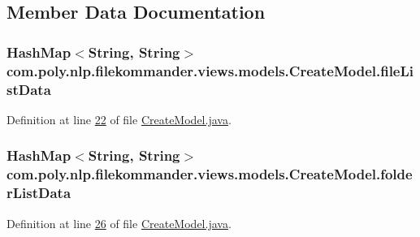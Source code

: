 \subsection{Member Data Documentation}
\hypertarget{classcom_1_1poly_1_1nlp_1_1filekommander_1_1views_1_1models_1_1_create_model_ab7b2c78de5e244603bf942be06d1aa82}{
\subsubsection[{file\-List\-Data}]{\setlength{\rightskip}{0pt plus 5cm}Hash\-Map$<$String, String$>$ com.\-poly.\-nlp.\-filekommander.\-views.\-models.\-Create\-Model.\-file\-List\-Data\hspace{0.3cm}{\ttfamily [private]}}}\label{classcom_1_1poly_1_1nlp_1_1filekommander_1_1views_1_1models_1_1_create_model_ab7b2c78de5e244603bf942be06d1aa82}


Definition at line \hyperlink{L22}{22} of file \hyperlink{}{Create\-Model.\-java}.

\hypertarget{classcom_1_1poly_1_1nlp_1_1filekommander_1_1views_1_1models_1_1_create_model_a4ffeca4b461f31e7024727e67ed4f0cf}{
\subsubsection[{folder\-List\-Data}]{\setlength{\rightskip}{0pt plus 5cm}Hash\-Map$<$String, String$>$ com.\-poly.\-nlp.\-filekommander.\-views.\-models.\-Create\-Model.\-folder\-List\-Data\hspace{0.3cm}{\ttfamily [private]}}}\label{classcom_1_1poly_1_1nlp_1_1filekommander_1_1views_1_1models_1_1_create_model_a4ffeca4b461f31e7024727e67ed4f0cf}


Definition at line \hyperlink{L26}{26} of file \hyperlink{}{Create\-Model.\-java}.

